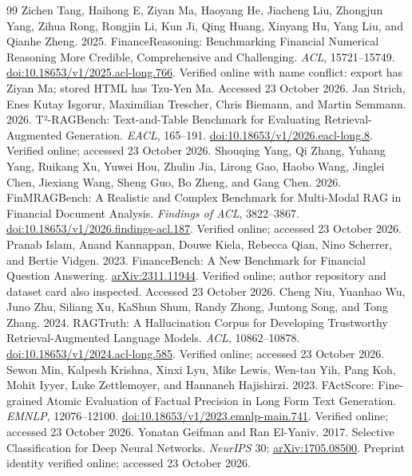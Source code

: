 \begin{thebibliography}{99}
\pbreak
{} Zichen Tang, Haihong E, Ziyan Ma, Haoyang He, Jiacheng Liu, Zhongjun Yang, Zihua Rong, Rongjin Li, Kun Ji, Qing Huang, Xinyang Hu, Yang Liu, and Qianhe Zheng. 2025. FinanceReasoning: Benchmarking Financial Numerical Reasoning More Credible, Comprehensive and Challenging. \emph{ACL}, 15721--15749. \href{https://aclanthology.org/2025.acl-long.766/}{doi:10.18653/v1/2025.acl-long.766}. Verified online with name conflict: export has Ziyan Ma; stored HTML has Tzu-Yen Ma. Accessed 23 October 2026.
 Jan Strich, Enes Kutay Isgorur, Maximilian Trescher, Chris Biemann, and Martin Semmann. 2026. T²-RAGBench: Text-and-Table Benchmark for Evaluating Retrieval-Augmented Generation. \emph{EACL}, 165--191. \href{https://aclanthology.org/2026.eacl-long.8/}{doi:10.18653/v1/2026.eacl-long.8}. Verified online; accessed 23 October 2026.
 Shouqing Yang, Qi Zhang, Yuhang Yang, Ruikang Xu, Yuwei Hou, Zhulin Jia, Lirong Gao, Haobo Wang, Jinglei Chen, Jiexiang Wang, Sheng Guo, Bo Zheng, and Gang Chen. 2026. FinMRAGBench: A Realistic and Complex Benchmark for Multi-Modal RAG in Financial Document Analysis. \emph{Findings of ACL}, 3822--3867. \href{https://aclanthology.org/2026.findings-acl.187/}{doi:10.18653/v1/2026.findings-acl.187}. Verified online; accessed 23 October 2026.
 Pranab Islam, Anand Kannappan, Douwe Kiela, Rebecca Qian, Nino Scherrer, and Bertie Vidgen. 2023. FinanceBench: A New Benchmark for Financial Question Answering. \href{https://arxiv.org/abs/2311.11944}{arXiv:2311.11944}. Verified online; author repository and dataset card also inspected. Accessed 23 October 2026.
 Cheng Niu, Yuanhao Wu, Juno Zhu, Siliang Xu, KaShun Shum, Randy Zhong, Juntong Song, and Tong Zhang. 2024. RAGTruth: A Hallucination Corpus for Developing Trustworthy Retrieval-Augmented Language Models. \emph{ACL}, 10862--10878. \href{https://aclanthology.org/2024.acl-long.585/}{doi:10.18653/v1/2024.acl-long.585}. Verified online; accessed 23 October 2026.
 Sewon Min, Kalpesh Krishna, Xinxi Lyu, Mike Lewis, Wen-tau Yih, Pang Koh, Mohit Iyyer, Luke Zettlemoyer, and Hannaneh Hajishirzi. 2023. FActScore: Fine-grained Atomic Evaluation of Factual Precision in Long Form Text Generation. \emph{EMNLP}, 12076--12100. \href{https://aclanthology.org/2023.emnlp-main.741/}{doi:10.18653/v1/2023.emnlp-main.741}. Verified online; accessed 23 October 2026.
 Yonatan Geifman and Ran El-Yaniv. 2017. Selective Classification for Deep Neural Networks. \emph{NeurIPS} 30; \href{https://arxiv.org/abs/1705.08500}{arXiv:1705.08500}. Preprint identity verified online; accessed 23 October 2026.

\end{thebibliography}
